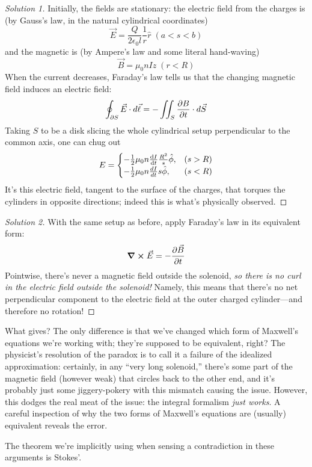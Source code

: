 \documentclass{article}
\begin{document}
\begin{proof}[Solution 1]
  Initially, the fields are stationary: the electric field from the charges is (by Gauss's law, in the natural cylindrical coordinates)
  \[
    \vec{E} = \frac{Q}{2\epsilon_{0}l}\frac{1}{r}\hat{r} \; (a < s < b)
  \]
  and the magnetic is (by Ampere's law and some literal hand-waving)
  \[
    \vec{B} = \mu_{0}nI\hat{z} \; (r < R)
  \]
  When the current decreases, Faraday's law tells us that the changing magnetic field induces an electric field:
  \[
    \oint_{\partial S} \vec{E} \cdot d\vec{\ell} = -\iint_{S} \pdv{B}{t} \cdot d\vec{S}
  \]
  Taking $S$ to be a disk slicing the whole cylindrical setup perpendicular to the common axis, one can chug out
  \[
    E =
    \begin{cases}
      -\frac{1}{2}\mu_{0}n\dv{I}{t}\frac{R^{2}}{s}\hat{\phi}, & (s > R) \\
      -\frac{1}{2}\mu_{0}n\frac{dI}{dt}s\hat{\phi}, & (s < R)
    \end{cases}
  \]
  It's this electric field, tangent to the surface of the charges, that torques the cylinders in opposite directions;
  indeed this is what's physically observed.
\end{proof}

\begin{proof}[Solution 2]
  With the same setup as before, apply Faraday's law in its equivalent form:
  \[
    \curl{\vec{E}} = -\pdv{\vec{B}}{t}
  \]
  Pointwise, there's never a magnetic field outside the solenoid, \textit{so there is no curl in the electric field outside the solenoid!}
  Namely, this means that there's no net perpendicular component to the electric field at the outer charged cylinder---and therefore no rotation!
\end{proof}

What gives?
The only difference is that we've changed which form of Maxwell's equations we're working with; they're supposed to be equivalent, right?
The physicist's resolution of the paradox is to call it a failure of the idealized approximation: certainly, in any ``very long solenoid,''
there's some part of the magnetic field (however weak) that circles back to the other end,
and it's probably just some jiggery-pokery with this mismatch causing the issue.
However, this dodges the real meat of the issue: the integral formalism \textit{just works}.
A careful inspection of why the two forms of Maxwell's equations are (usually) equivalent reveals the error.

The theorem we're implicitly using when sensing a contradiction in these arguments is Stokes'.
\end{document}
